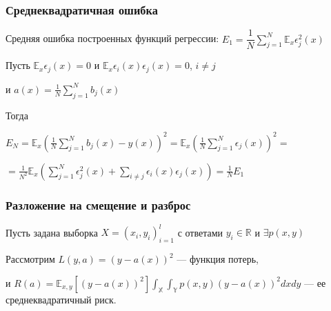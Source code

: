 \documentclass[fleqn,pdf, 9pt, usenames, dvipsnames, unicode, hyperref={bookmarks=true,bookmarksopen=false, bookmarksnumbered}]{beamer}
\begin{document}

\begin{frame}\frametitle{Среднеквадратичная ошибка}

Средняя ошибка построенных функций регрессии: 
$E_1 =  \dfrac{1}{N}\sum_{j=1}^{N}\mathbb{E}_x\epsilon^2_j(x)$

Пусть 
$\mathbb{E}_x\epsilon_j(x) = 0$ \qquad и \qquad
$ \mathbb{E}_x\epsilon_i(x)\epsilon_j(x) = 0$,  $i\neq j$

и $a(x) = \frac{1}{N}\sum_{j=1}^{N}b_j(x)$ 

Тогда 

$E_N = \mathbb{E}_x\left(\frac{1}{N}\sum_{j=1}^{N}b_j(x)-y(x)\right)^2 = \mathbb{E}_x\left(\frac{1}{N}\sum_{j=1}^{N}\epsilon_j(x)\right)^2 = $

$=\frac{1}{N^2}\mathbb{E}_x\left(\sum_{j=1}^{N}\epsilon^2_j(x) + \sum_{i\neq j}^{}\epsilon_i(x)\epsilon_j(x)\right)=\frac{1}{N}E_1$

\end{frame}


\begin{frame}\frametitle{Разложение на смещение и разброс}


Пусть задана выборка $X = (x_i,y_i)^l_{i=1}$ с ответами $y_i \in \mathbb{R}$ и $\exists p(x,y)$

Рассмотрим $L(y,a) = (y-a(x))^2$ --- функция потерь,

и $R(a) = \mathbb{E}_{x,y}\left[(y-a(x))^2\right] \int_{\mathbb{X}}\int_{\mathbb{Y}} p(x,y)(y-a(x))^2dxdy$ --- ее среднеквадратичный риск.

\end{frame}

\end{document}
